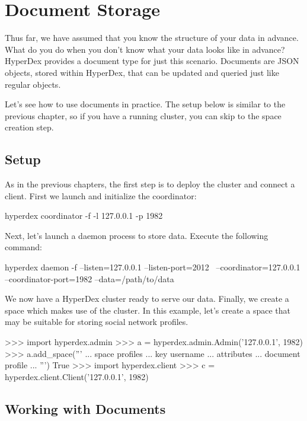 \chapter{Document Storage}
\label{chap:documents}

Thus far, we have assumed that you know the structure of your data in advance.
What do you do when you don't know what your data looks like in advance?
HyperDex provides a document type for just this scenario.  Documents are JSON
objects, stored within HyperDex, that can be updated and queried just like
regular objects.

Let's see how to use documents in practice.  The setup below is similar to the
previous chapter, so if you have a running cluster, you can skip to the space
creation step.

\section{Setup}
\label{sec:documents:setup}

As in the previous chapters, the first step is to deploy the cluster and connect
a client.   First we launch and initialize the coordinator:

\begin{consolecode}
hyperdex coordinator -f -l 127.0.0.1 -p 1982
\end{consolecode}

Next, let's launch a daemon process to store data.  Execute the following
command:

\begin{consolecode}
hyperdex daemon -f --listen=127.0.0.1 --listen-port=2012 \
                   --coordinator=127.0.0.1 --coordinator-port=1982 --data=/path/to/data
\end{consolecode}

We now have a HyperDex cluster ready to serve our data.  Finally, we create a
space which makes use of the cluster.  In this example, let's create a space
that may be suitable for storing social network profiles.

\begin{pythoncode}
>>> import hyperdex.admin
>>> a = hyperdex.admin.Admin('127.0.0.1', 1982)
>>> a.add_space('''
... space profiles
... key username
... attributes
...    document profile
... ''')
True
>>> import hyperdex.client
>>> c = hyperdex.client.Client('127.0.0.1', 1982)
\end{pythoncode}

\section{Working with Documents}

